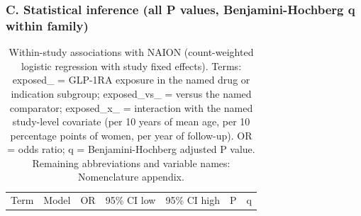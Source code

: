 \documentclass[
  11pt,
]{article}
\begin{document}
\subsubsection{C. Statistical inference (all P values,
Benjamini-Hochberg q within
family)}\label{c.-statistical-inference-all-p-values-benjamini-hochberg-q-within-family}

\begin{longtable}[]{@{}
  >{\raggedright\arraybackslash}p{}
  >{\raggedright\arraybackslash}p{}
  >{\raggedright\arraybackslash}p{}
  >{\raggedright\arraybackslash}p{}
  >{\raggedright\arraybackslash}p{}
  >{\raggedright\arraybackslash}p{}
  >{\raggedright\arraybackslash}p{}@{}}
\caption{Within-study associations with NAION (count-weighted logistic
regression with study fixed effects). Terms: exposed\_ = GLP-1RA
exposure in the named drug or indication subgroup; exposed\_vs\_ =
versus the named comparator; exposed\_x\_ = interaction with the named
study-level covariate (per 10 years of mean age, per 10 percentage
points of women, per year of follow-up). OR = odds ratio; q =
Benjamini-Hochberg adjusted P value. Remaining abbreviations and
variable names: Nomenclature appendix.}\tabularnewline
\toprule\noalign{}
\begin{minipage}[b]{\linewidth}\raggedright
Term
\end{minipage} & \begin{minipage}[b]{\linewidth}\raggedright
Model
\end{minipage} & \begin{minipage}[b]{\linewidth}\raggedright
OR
\end{minipage} & \begin{minipage}[b]{\linewidth}\raggedright
95\% CI low
\end{minipage} & \begin{minipage}[b]{\linewidth}\raggedright
95\% CI high
\end{minipage} & \begin{minipage}[b]{\linewidth}\raggedright
P
\end{minipage} & \begin{minipage}[b]{\linewidth}\raggedright
q
\end{minipage} \\

\end{longtable}
\end{document}
